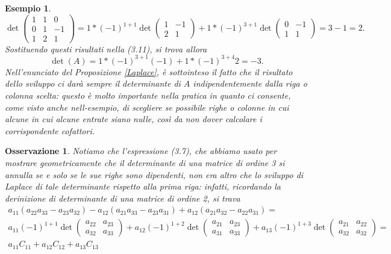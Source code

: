 \documentclass{book}
\newtheorem{esempio}{Esempio}
\newtheorem{osservazione}{Osservazione}
\begin{document}
\begin{esempio}
\begin{equation*}
    \det\begin{pmatrix} 1 & 1 & 0 \\ 0 & 1 & -1 \\ 1 & 2 & 1\end{pmatrix}=1*(-1)^{1+1}\det\begin{pmatrix} 1 & -1 \\ 2 & 1 \end{pmatrix} + 1 * (-1)^{3+1}\det\begin{pmatrix} 0 & -1 \\ 1 & 1\end{pmatrix} =3-1=2.
  \end{equation*}
  Sostituendo questi risultati nella (3.11), si trova allora
  \begin{equation*}
    \det(A)=1*(-1)^{3+1}(-1)+1*(-1)^{3+4}2=-3.
  \end{equation*}
  Nell'enunciato del Proposizione \ref{Laplace}, è sottointeso il fatto che il risultato dello sviluppo ci darà sempre il determinante di $A$ indipendentemente dalla riga o colonna scelta: questo è molto importante nella pratica in quanto ci consente, come visto anche nell-esempio, di scegliere se possibile righe o colonne in cui alcune in cui alcune entrate siano nulle, così da non dover calcolare i corrispondente cofattori. 
\end{esempio}
\begin{osservazione}
  Notiamo che l'espressione (3.7), che abbiamo usato per mostrare geometricamente che il determinante di una matrice di ordine 3 si annulla se e solo se le sue righe sono dipendenti, non era altro che lo sviluppo di Laplace di tale determinante rispetto alla prima riga: infatti, ricordando la derinizione di determinante di una matrice di ordine 2, si trava
  \begin{equation*}
	\begin{matrix}
          a_{11}(a_{22}a_{33}-a_{23}a_{32})-a_{12}(a_{21}a_{33}-a_{23}a_{31})+a_{12}(a_{21}a_{32}-a_{22}a_{31})=\\
          a_{11}(-1)^{1+1}\det\begin{pmatrix} a_{22} & a_{23} \\ a_{32} & a_{33}\end{pmatrix}+a_{12}(-1)^{1+2}\det\begin{pmatrix} a_{21} & a_{23} \\ a_{31} & a_{33}\end{pmatrix}+a_{13}(-1)^{1+3}\det\begin{pmatrix} a_{21} & a_{22} \\ a_{32} & a_{32}\end{pmatrix}=\\a_{11}C_{11}+a_{12}C_{12}+a_{13}C_{13}
        \end{matrix}
  \end{equation*} 
\end{osservazione}
\end{document}
